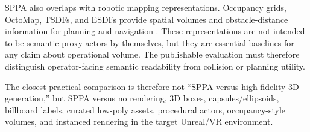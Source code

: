 ﻿\documentclass[11pt,a4paper]{article}
\begin{document}
SPPA also overlaps with robotic mapping representations. Occupancy grids,
OctoMap, TSDFs, and ESDFs provide spatial volumes and obstacle-distance
information for planning and navigation
\cite{hornung2013octomap,oleynikova2017voxblox}. These representations are not
intended to be semantic proxy actors by themselves, but they are essential
baselines for any claim about operational volume. The publishable evaluation
must therefore distinguish operator-facing semantic readability from collision or
planning utility.

The closest practical comparison is therefore not ``SPPA versus high-fidelity
3D generation,'' but SPPA versus no rendering, 3D boxes, capsules/ellipsoids,
billboard labels, curated low-poly assets, procedural actors, occupancy-style
volumes, and instanced rendering in the target Unreal/VR environment.
\end{document}
